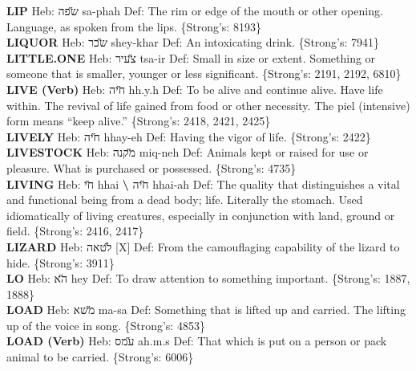 {\textbf{LIP} Heb: {\large\H שפה} sa-phah Def: The rim or edge of the mouth or other opening. Language, as spoken from the lips. \{Strong's: 8193\}\hfill{}\\

\textbf{LIQUOR} Heb: {\large\H שכר} shey-khar Def: An intoxicating drink. \{Strong's: 7941\}\hfill{}\\

\textbf{LITTLE.ONE} Heb: {\large\H צעיר} tsa-ir Def: Small in size or extent. Something or someone that is smaller, younger or less significant. \{Strong's: 2191, 2192, 6810\}\hfill{}\\

\textbf{LIVE (Verb)} Heb: {\large\H חיה} hh.y.h Def: To be alive and continue alive. Have life within. The revival of life gained from food or other necessity. The piel (intensive) form means ``keep alive.'' \{Strong's: 2418, 2421, 2425\}\hfill{}\\

\textbf{LIVELY} Heb: {\large\H חיה} hhay-eh Def: Having the vigor of life. \{Strong's: 2422\}\hfill{}\\

\textbf{LIVESTOCK} Heb: {\large\H מקנה} miq-neh Def: Animals kept or raised for use or pleasure. What is purchased or possessed. \{Strong's: 4735\}\hfill{}\\

\textbf{LIVING} Heb: {\large\H חי} hhai \textbf{\textbackslash{}} {\large\H חיה} hhai-ah Def: The quality that distinguishes a vital and functional being from a dead body; life. Literally the stomach. Used idiomatically of living creatures, especially in conjunction with land, ground or field. \{Strong's: 2416, 2417\}\hfill{}\\

\textbf{LIZARD} Heb: {\large\H לטאה} {[}X{]} Def: From the camouflaging capability of the lizard to hide. \{Strong's: 3911\}\hfill{}\\

\textbf{LO} Heb: {\large\H הא} hey Def: To draw attention to something important. \{Strong's: 1887, 1888\}\hfill{}\\

\textbf{LOAD} Heb: {\large\H משא} ma-sa Def: Something that is lifted up and carried. The lifting up of the voice in song. \{Strong's: 4853\}\hfill{}\\

\textbf{LOAD (Verb)} Heb: {\large\H עמס} ah.m.s Def: That which is put on a person or pack animal to be carried. \{Strong's: 6006\}\hfill{}\\

}
